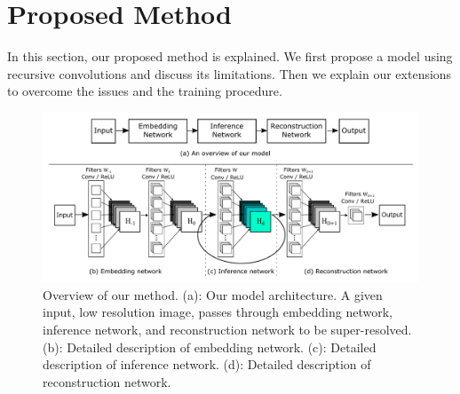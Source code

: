 \documentclass[10pt,twocolumn,letterpaper]{article}
\begin{document}
%
%
%
%
\section{Proposed Method}
In this section, our proposed method is explained. We first propose a model using recursive convolutions and discuss its limitations. Then we explain our extensions to overcome the issues and the training procedure.

\begin{figure}[t]
	\includegraphics[width=\textwidth]{figs/f1}
	\caption {Overview of our method. (a): Our model architecture. A given input, low resolution image, passes through embedding network, inference network, and reconstruction network to be super-resolved. (b): Detailed description of embedding network. (c): Detailed description of inference network. (d): Detailed description of reconstruction network.}
	\label{fig:overview}
\end{figure}
\end{document}
